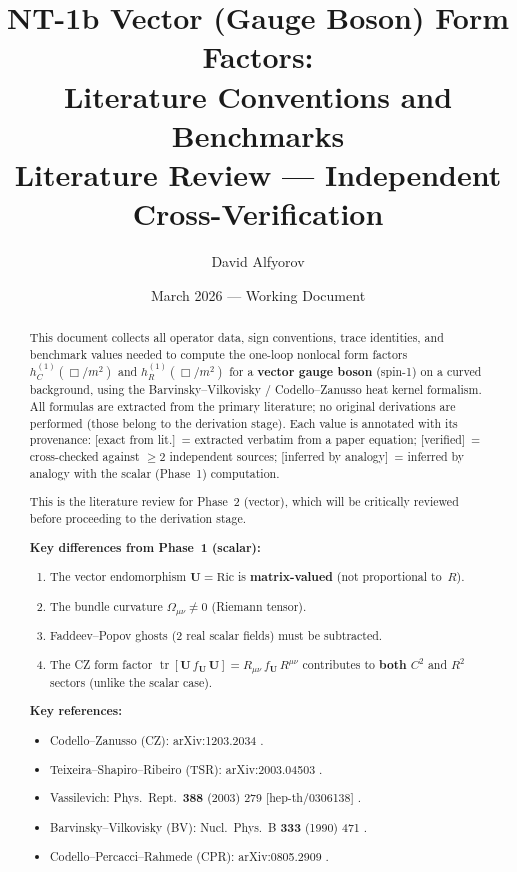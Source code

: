 \documentclass[12pt,a4paper]{article}
\title{\textbf{NT-1b Vector (Gauge Boson) Form Factors:\\[4pt]
       Literature Conventions and Benchmarks}\\[8pt]
       {\normalsize Literature Review --- Independent Cross-Verification}}
\author{David Alfyorov}
\date{March 2026 --- Working Document}
\theoremstyle{definition}
\theoremstyle{remark}
\newcommand{\tr}{\operatorname{tr}}
\newcommand{\exactlit}{\textcolor{blue!60!black}{\textsf{[exact from lit.]}}}
\newcommand{\verified}{\textcolor{green!50!black}{\textsf{[verified]}}}
\newcommand{\inferred}{\textcolor{orange!60!black}{\textsf{[inferred by analogy]}}}
\begin{document}
\maketitle

\begin{center}
\end{center}

\thispagestyle{empty}

\begin{abstract}
This document collects all operator data, sign conventions, trace
identities, and benchmark values needed to compute the one-loop nonlocal
form factors $h_C^{(1)}(\Box/m^2)$ and $h_R^{(1)}(\Box/m^2)$ for a
\textbf{vector gauge boson} (spin-1) on a curved background, using the
Barvinsky--Vilkovisky / Codello--Zanusso heat kernel formalism.
All formulas are extracted from the primary literature; no original
derivations are performed (those belong to the derivation stage).
Each value is annotated with its provenance:
\exactlit\ = extracted verbatim from a paper equation;
\verified\ = cross-checked against $\geq 2$ independent sources;
\inferred\ = inferred by analogy with the scalar (Phase~1) computation.

This is the literature review for Phase~2 (vector), which will be critically
reviewed before proceeding to the derivation stage.

\medskip\noindent
\textbf{Key differences from Phase~1 (scalar):}
\begin{enumerate}[nosep]
\item The vector endomorphism $\mathbf{U} = \mathrm{Ric}$ is
  \textbf{matrix-valued} (not proportional to~$R$).
\item The bundle curvature $\Omega_{\mu\nu} \neq 0$ (Riemann tensor).
\item Faddeev--Popov ghosts (2 real scalar fields) must be subtracted.
\item The CZ form factor $\tr[\mathbf{U}\,f_{\mathbf{U}}\,\mathbf{U}]
  = R_{\mu\nu}\,f_{\mathbf{U}}\,R^{\mu\nu}$ contributes to \textbf{both}
  $C^2$ and $R^2$ sectors (unlike the scalar case).
\end{enumerate}

\medskip\noindent
\textbf{Key references:}
\begin{itemize}[nosep]
\item Codello--Zanusso (CZ): arXiv:1203.2034 \cite{CZ2012}.
\item Teixeira--Shapiro--Ribeiro (TSR): arXiv:2003.04503 \cite{TSR2020}.
\item Vassilevich: Phys.\ Rept.\ \textbf{388} (2003) 279
  [hep-th/0306138] \cite{Vassilevich2003}.
\item Barvinsky--Vilkovisky (BV): Nucl.\ Phys.\ B \textbf{333} (1990) 471
  \cite{BV1990a}.
\item Codello--Percacci--Rahmede (CPR): arXiv:0805.2909 \cite{CPR2009}.
\end{itemize}


\end{abstract}
\end{document}

